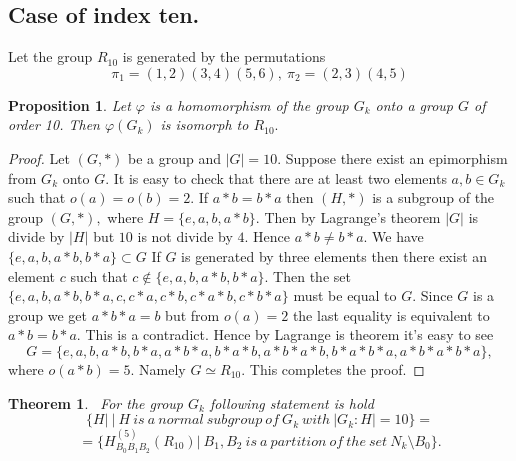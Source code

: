 \documentclass[12pt,reqno]{amsart}
\newtheorem{thm}{Theorem}
\newtheorem{pro}{Proposition}
\numberwithin{equation}{section}
\begin{document}
\subsection{Case of index ten.}

 Let the group $R_{10}$ is generated by the permutations
$$\pi_{1}=(1,2)(3,4)(5,6), \ \pi_{2}=(2,3)(4,5)$$

\begin{pro}\label{p2.1} Let $\varphi$ is a homomorphism of the group $G_{k}$ onto a group $G$ of order 10.
 Then
 $\varphi(G_{k})$ is isomorph to $R_{10}.$
\end{pro}

\begin{proof} Let $(G,\ast)$ be a group and $|G|=10.$ Suppose
there exist an epimorphism from $G_{k}$ onto $G.$ It is easy to
check that there are at least two elements $a,b\in G_{k}$ such
that $o(a)=o(b)=2.$ If $a\ast b=b\ast a$ then $(H,\ast)$ is a
subgroup of the group $(G,\ast),$ where $H=\{e,a,b,a\ast b\}.$
Then by Lagrange's theorem $|G|$ is divide by $|H|$ but $10$ is
not divide by $4.$ Hence $a\ast b\neq b\ast a.$ We have
$\{e,a,b,a\ast b,b\ast a\}\subset G$ If $G$ is generated by three
elements then there exist an element $c$ such that $c\notin
\{e,a,b,a\ast b,b\ast a\}.$ Then the set $\{e,a,b,a\ast b, b\ast
a, c,c\ast a, c\ast b, c\ast a\ast b, c\ast b\ast a\}$ must be
equal to $G.$ Since $G$ is a group we get $a\ast b\ast a=b$ but
from $o(a)=2$ the last equality is equivalent to $a\ast b=b\ast
a.$ This is a contradict. Hence by Lagrange is theorem it's easy
to see
$$G=\{e,a,b,a\ast b, b\ast a, a\ast b\ast a, b\ast a\ast b,a\ast
b\ast a\ast b,b\ast a\ast b\ast a,a\ast b\ast a\ast b\ast a\},$$
where $o(a\ast b)=5.$ Namely $G\simeq R_{10}.$ This completes the
proof.
\end{proof}

\begin{thm}\label{th2} \  For the group
$G_{k}$ following statement is hold
$$\{H|\ |\ H\ is\ a\ normal\ subgroup\ of\ G_{k}\ with\ |G_{k}:H|=10\}=$$
$$=\{H^{(5)}_{B_{0}B_{1}B_{2}}(R_{10})|\ B_{1},
B_{2} \ is\ a\ partition\ of\ the\ set\ N_{k}\setminus B_{0}\}.$$
\end{thm}
\end{document}
